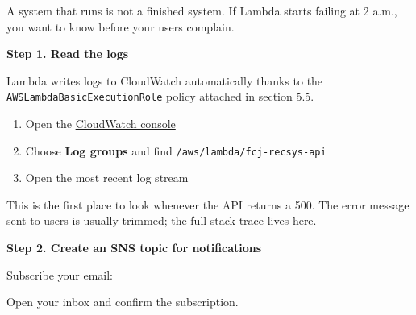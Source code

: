 A system that runs is not a finished system. If Lambda starts failing at
2 a.m., you want to know before your users complain.

\vspace{0.5em}\noindent\textbf{Step 1. Read the logs}\par

Lambda writes logs to CloudWatch automatically thanks to the
\texttt{AWSLambdaBasicExecutionRole} policy attached in section 5.5.

\begin{enumerate}
\def\labelenumi{\arabic{enumi}.}
\tightlist
\item
  Open the
  \href{https://ap-southeast-1.console.aws.amazon.com/cloudwatch/home?region=ap-southeast-1}{CloudWatch
  console}
\item
  Choose \textbf{Log groups} and find
  \texttt{/aws/lambda/fcj-recsys-api}
\item
  Open the most recent log stream
\end{enumerate}

This is the first place to look whenever the API returns a 500. The
error message sent to users is usually trimmed; the full stack trace
lives here.

\vspace{0.5em}\noindent\textbf{Step 2. Create an SNS topic for
notifications}\par

\begin{Shaded}
\begin{Highlighting}[]
\end{Highlighting}
\end{Shaded}

Subscribe your email:

\begin{Shaded}
\begin{Highlighting}[]
\DataTypeTok{\textbackslash{}}
   \OperatorTok{\textless{}}\OperatorTok{\textgreater{}} \DataTypeTok{\textbackslash{}}
  \DataTypeTok{\textbackslash{}}
\end{Highlighting}
\end{Shaded}

Open your inbox and confirm the subscription.

